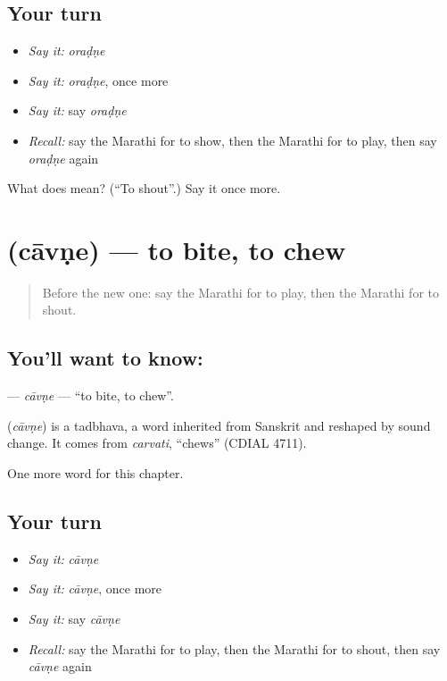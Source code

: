 \subsection*{Your turn}
\begin{itemize}
\raggedright
  \item \emph{Say it:} \emph{oraḍṇe}
  \item \emph{Say it:} \emph{oraḍṇe}, once more
  \item \emph{Say it:} say \emph{oraḍṇe}
  \item \emph{Recall:} say the Marathi for to show, then the Marathi for to play, then say \emph{oraḍṇe} again
\end{itemize}

\begin{tcolorbox}[breakable,colback=teal!4,colframe=teal!35!black,title={Before you move on}]
What does  mean? (\textquotedblleft{}To shout\textquotedblright{}.) Say it once more.
\end{tcolorbox}
\section[\texorpdfstring{\mr{चावणे} (cāvṇe)}{चावणे (cāvṇe)}]{ (cāvṇe) — to bite, to chew}

\label{lesson:MR-C156-cavne}



\begin{quote}
Before the new one: say the Marathi for to play, then the Marathi for to shout.
\end{quote}

\subsection*{You'll want to know: }
\textbf{} — \emph{cāvṇe} — \textquotedblleft{}to bite, to chew\textquotedblright{}.

\begin{cousinweb}
\textbf{} (\emph{cāvṇe}) is a tadbhava, a word inherited from Sanskrit and reshaped by sound change. It comes from \emph{carvati}, \textquotedblleft{}chews\textquotedblright{} (CDIAL 4711).
\end{cousinweb}

\begin{grammarlens}[title={What you've built}]
One more word for this chapter.
\end{grammarlens}

\subsection*{Your turn}
\begin{itemize}
\raggedright
  \item \emph{Say it:} \emph{cāvṇe}
  \item \emph{Say it:} \emph{cāvṇe}, once more
  \item \emph{Say it:} say \emph{cāvṇe}
  \item \emph{Recall:} say the Marathi for to play, then the Marathi for to shout, then say \emph{cāvṇe} again
\end{itemize}

